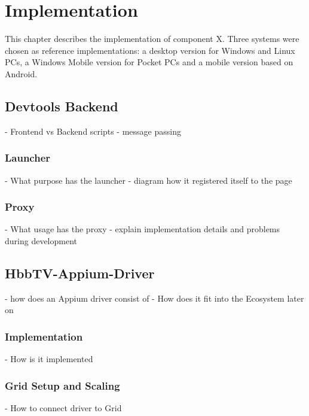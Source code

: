 \chapter{Implementation\label{cha:chapter5}}

This chapter describes the implementation of component X. Three systems were chosen as
reference implementations: a desktop version for Windows and Linux PCs, a Windows Mobile
version for Pocket PCs and a mobile version based on Android.

\section{Devtools Backend\label{sec:implDevtoolsBackend}}

- Frontend vs Backend scripts
- message passing

\subsection{Launcher\label{sec:launcher}}

- What purpose has the launcher
- diagram how it registered itself to the page

\subsection{Proxy\label{sec:proxy}}

- What usage has the proxy
- explain implementation details and problems during development

\section{HbbTV-Appium-Driver\label{sec:driver}}

- how does an Appium driver consist of
- How does it fit into the Ecosystem later on

\subsection{Implementation\label{sec:implDriver}}

- How is it implemented

\subsection{Grid Setup and Scaling\label{sec:setupscaling}}

- How to connect driver to Grid

